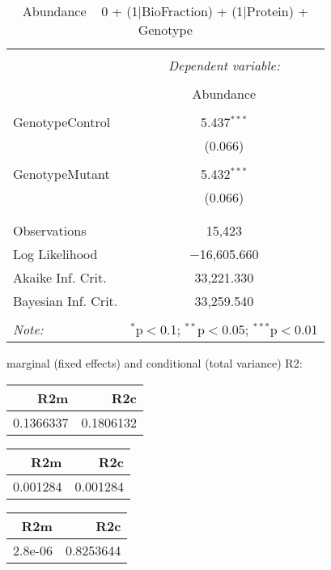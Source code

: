 \documentclass[11pt]{report}
\begin{document}
\begin{table}[!htbp] \centering 
  \caption{Abundance ~ 0 + (1|BioFraction) + (1|Protein) + Genotype} 
  \label{} 
\begin{tabular}{@{\extracolsep{5pt}}lc} 
\\[-1.8ex]\hline 
\hline \\[-1.8ex] 
 & \multicolumn{1}{c}{\textit{Dependent variable:}} \\ 
\cline{2-2} 
\\[-1.8ex] & Abundance \\ 
\hline \\[-1.8ex] 
 GenotypeControl & 5.437$^{***}$ \\ 
  & (0.066) \\ 
  & \\ 
 GenotypeMutant & 5.432$^{***}$ \\ 
  & (0.066) \\ 
  & \\ 
\hline \\[-1.8ex] 
Observations & 15,423 \\ 
Log Likelihood & $-$16,605.660 \\ 
Akaike Inf. Crit. & 33,221.330 \\ 
Bayesian Inf. Crit. & 33,259.540 \\ 
\hline 
\hline \\[-1.8ex] 
\textit{Note:}  & \multicolumn{1}{r}{$^{*}$p$<$0.1; $^{**}$p$<$0.05; $^{***}$p$<$0.01} \\ 
\end{tabular} 
\end{table} 
marginal (fixed effects) and conditional (total variance) R2:

\begin{tabular}{r|r}
\hline
R2m & R2c\\
\hline
0.1366337 & 0.1806132\\
\hline
\end{tabular}

\begin{tabular}{r|r}
\hline
R2m & R2c\\
\hline
0.001284 & 0.001284\\
\hline
\end{tabular}

\begin{tabular}{r|r}
\hline
R2m & R2c\\
\hline
2.8e-06 & 0.8253644\\
\hline
\end{tabular}
\end{document}
